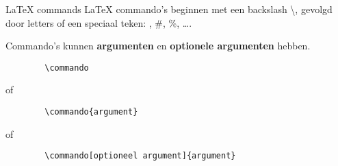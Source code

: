 \copyrightTim

\begin{frame}[fragile]{LaTeX commands}
    LaTeX commando's beginnen met een backslash \textbackslash, gevolgd door letters of een speciaal teken: \@, \#, \%, \ldots.

    Commando's kunnen \textbf{argumenten} en \textbf{optionele argumenten} hebben.

    \begin{verbatim}
        \commando
    \end{verbatim}
    of
    \begin{verbatim}
        \commando{argument}
    \end{verbatim}
    of
    \begin{verbatim}
        \commando[optioneel argument]{argument}
    \end{verbatim}

\end{frame}